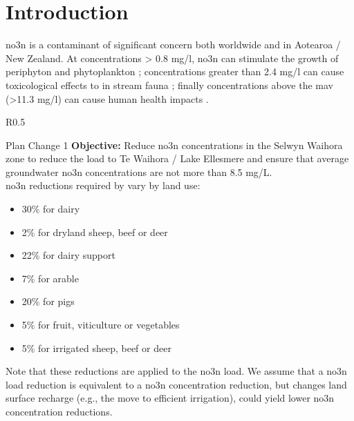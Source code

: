 
\section[Introduction]{Introduction} \label{sec:intro}

\gls{no3n} is a contaminant of significant concern both worldwide and in Aotearoa / New Zealand.
At concentrations > 0.8 mg/l, \gls{no3n} can stimulate the growth of periphyton and phytoplankton \citep{mcdowell_global_2020}; concentrations greater than 2.4 mg/l can cause toxicological effects to in stream fauna \citep{camargo_nitrate_2005, horak_assessing_2019,wagenhoff_identifying_2017};
finally concentrations above the \gls{mav} (>11.3 mg/l) can cause human health impacts \citep{rahman_anthropogenic_2021}.

\begin{wrapfigure}{R}{0.5\textwidth}
    \begin{breakawaybox}[label={box:no3_red}]{Plan Change 1}
        \textbf{Objective:} Reduce \gls{no3n} concentrations in the Selwyn Waihora zone to reduce the load to Te Waihora / Lake Ellesmere and ensure that average groundwater \gls{no3n} concentrations are not more than 8.5 mg/L.\\

        \gls{no3n} reductions required by  vary by land use:
        \begin{itemize}
            \item 30\% for dairy
            \item 2\% for dryland sheep, beef or deer
            \item 22\% for dairy support
            \item 7\% for arable
            \item 20\% for pigs
            \item 5\% for fruit, viticulture or vegetables
            \item 5\% for irrigated sheep, beef or deer
        \end{itemize}

        Note that these reductions are applied to the \gls{no3n} load.
        We assume that a \gls{no3n} load reduction is equivalent to a \gls{no3n} concentration reduction, but changes land surface recharge (e.g., the move to efficient irrigation), could yield lower \gls{no3n} concentration reductions.
    \end{breakawaybox}
\end{wrapfigure}

